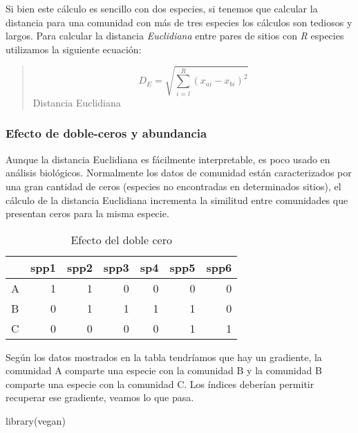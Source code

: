 \documentclass[
]{article}
\newenvironment{Shaded}{\begin{snugshade}}{\end{snugshade}}
\newcommand{\FunctionTok}[1]{\textcolor[rgb]{0.00,0.00,0.00}{#1}}
\newcommand{\NormalTok}[1]{#1}
\begin{document}
Si bien este cálculo es sencillo con dos especies, si tenemos que calcular la distancia para una comunidad con más de tres especies los cálculos son tediosos y largos. Para calcular la distancia \emph{Euclidiana} entre pares de sitios con \emph{R} especies utilizamos la siguiente ecuación:

\begin{quote}
\[D_E = \sqrt{\sum_{i=l}^R (x_{ai} - x_{bi})^2}\]
Distancia Euclidiana
\end{quote}

\hypertarget{efecto-de-doble-ceros-y-abundancia}{%
\subsubsection{Efecto de doble-ceros y abundancia}\label{efecto-de-doble-ceros-y-abundancia}}

Aunque la distancia Euclidiana es fácilmente interpretable, es poco usado en análisis biológicos. Normalmente los datos de comunidad están caracterizados por una gran cantidad de ceros (especies no encontradas en determinados sitios), el cálculo de la distancia Euclidiana incrementa la similitud entre comunidades que presentan ceros para la misma especie.

\begin{table}

\caption{\label{tab:unnamed-chunk-10}Efecto del doble cero}
\centering
\begin{tabular}[t]{l|r|r|r|r|r|r}
\hline
  & spp1 & spp2 & spp3 & sp4 & spp5 & spp6\\
\hline
A & 1 & 1 & 0 & 0 & 0 & 0\\
\hline
B & 0 & 1 & 1 & 1 & 1 & 0\\
\hline
C & 0 & 0 & 0 & 0 & 1 & 1\\
\hline
\end{tabular}
\end{table}

Según los datos mostrados en la tabla tendríamos que hay un gradiente, la comunidad A comparte una especie con la comunidad B y la comunidad B comparte una especie con la comunidad C. Los índices deberían permitir recuperar ese gradiente, veamos lo que pasa.

\begin{Shaded}
\begin{Highlighting}[]
\FunctionTok{library}\NormalTok{(vegan)}
\end{Highlighting}
\end{Shaded}
\end{document}
